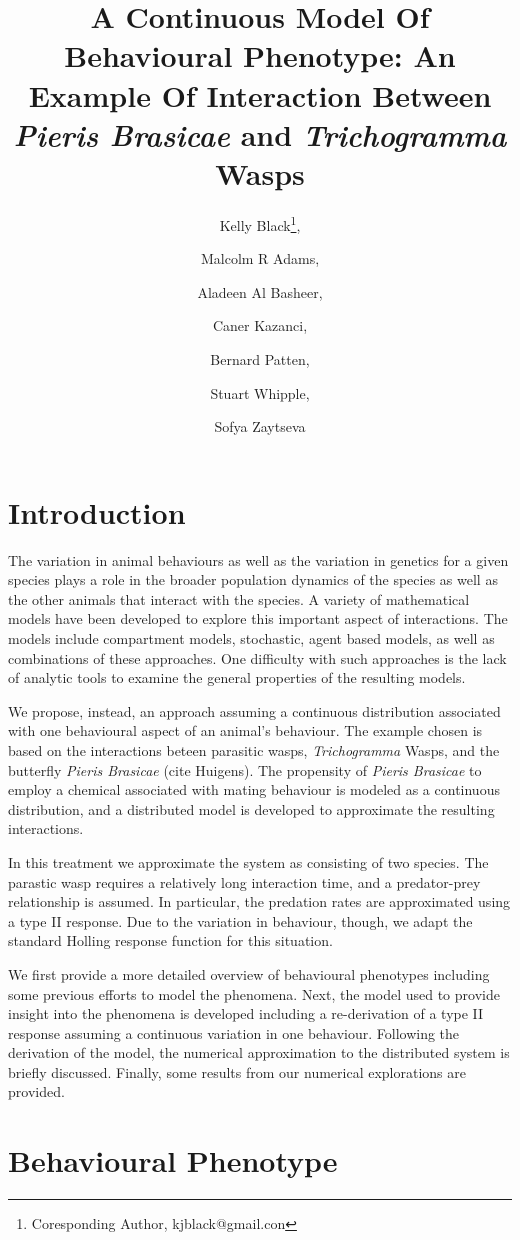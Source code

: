 \documentclass[12pt]{article}
\title{A Continuous Model Of Behavioural Phenotype: An Example Of
  Interaction Between \textit{Pieris Brasicae} and
  \textit{Trichogramma} Wasps}
\author{Kelly Black\thanks{Coresponding Author, kjblack@gmail.con},
  \and Malcolm R Adams, \and Aladeen Al Basheer, \and Caner Kazanci,
  \and Bernard Patten, \and Stuart Whipple, \and Sofya Zaytseva}
\begin{document}
\maketitle

\section{Introduction}

The variation in animal behaviours as well as the variation in
genetics for a given species plays a role in the broader population
dynamics of the species as well as the other animals that interact
with the species. A variety of mathematical models have been developed
to explore this important aspect of interactions. The models include
compartment models, stochastic, agent based models, as well as
combinations of these approaches. One difficulty with such approaches
is the lack of analytic tools to examine the general properties of the
resulting models.

We propose, instead, an approach assuming a continuous distribution
associated with one behavioural aspect of an animal's behaviour. The
example chosen is based on the interactions beteen parasitic wasps,
\textit{Trichogramma} Wasps, and the butterfly \textit{Pieris
  Brasicae} (cite Huigens).  The propensity of \textit{Pieris
  Brasicae} to employ a chemical associated with mating behaviour is
modeled as a continuous distribution, and a distributed model is
developed to approximate the resulting interactions.

In this treatment we approximate the system as consisting of two
species. The parastic wasp requires a relatively long interaction
time, and a predator-prey relationship is assumed. In particular, the
predation rates are approximated using a type II response. Due to the
variation in behaviour, though, we adapt the standard Holling response
function for this situation.

We first provide a more detailed overview of behavioural phenotypes
including some previous efforts to model the phenomena. Next, the
model used to provide insight into the phenomena is developed
including a re-derivation of a type II response assuming a continuous
variation in one behaviour. Following the derivation of the model, the
numerical approximation to the distributed system is briefly
discussed. Finally, some results from our numerical explorations are
provided.

\section{Behavioural Phenotype}
\label{section:behaviouralPhenotype}
\end{document}
